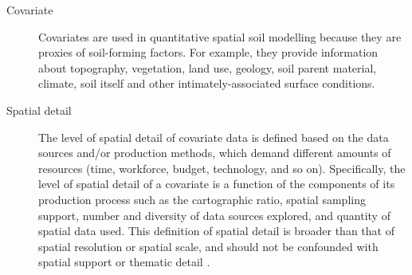 


\begin{description}
 \item[Covariate] Covariates are used in quantitative spatial soil modelling because they are 
 proxies of soil-forming factors. For example, they provide information about topography, 
 vegetation, land use, geology, soil parent material, climate, soil itself and other 
 intimately-associated surface conditions.
 
 \item[Spatial detail] The level of spatial detail of covariate data is defined based on the data 
 sources and/or production methods, which demand different amounts of resources (time, workforce, 
 budget, technology, and so on). Specifically, the level of spatial detail of a covariate is a 
 function of the components of its production process such as the cartographic ratio, spatial 
 sampling support, number and diversity of data sources explored, and quantity of spatial data used. 
 This definition of spatial detail is broader than that of spatial resolution or spatial scale, and 
 should not be confounded with spatial support \cite{WebsterEtAl2007} or thematic detail 
 \cite{Rossiter2000}.
\end{description}